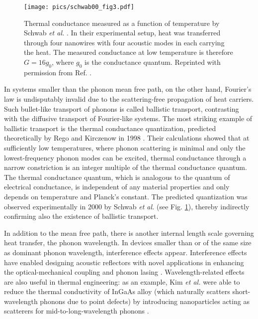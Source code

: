 \begin{figure}
\begin{center}
 \texttt{[image: pics/schwab00\_fig3.pdf]}
 \caption{Thermal conductance measured as a function of temperature by Schwab \textit{et al.} \cite{schwab00}. In their experimental setup, heat was transferred through four nanowires with four acoustic modes in each carrying the heat. The measured conductance at low temperature is therefore $G=16g_0$, where $g_0$ is the conductance quantum. Reprinted with permission from Ref. \cite{schwab00}.}
\label{fig:intro_schwab}
\end{center}
\end{figure}

In systems smaller than the phonon mean free path, on the other hand, Fourier's law is undisputably invalid due to the scattering-free propagation of heat carriers. Such bullet-like transport of phonons is called ballistic transport, contrasting with the diffusive transport of Fourier-like systems. The most striking example of ballistic transport is the thermal conductance quantization, predicted theoretically by Rego and Kirczenow in 1998 \cite{rego98}. Their calculations showed that at sufficiently low temperatures, where phonon scattering is minimal and only the lowest-frequency phonon modes can be excited, thermal conductance through a narrow constriction is an integer multiple of the thermal conductance quantum. The thermal conductance quantum, which is analogous to the quantum of electrical conductance, is independent of any material properties and only depends on temperature and Planck's constant. The predicted quantization was observed experimentally in 2000 by Schwab \textit{et al.} \cite{schwab00} (see Fig. \ref{fig:intro_schwab}), thereby indirectly confirming also the existence of ballistic transport.

In addition to the mean free path, there is another internal length scale governing heat transfer, the phonon wavelength. In devices smaller than or of the same size as dominant phonon wavelength, interference effects appear. Interference effects have enabled designing acoustic reflectors with novel applications in enhancing the optical-mechanical coupling \cite{fainstein13} and phonon lasing \cite{maryam13}. Wavelength-related effects are also useful in thermal engineering: as an example, Kim \textit{et al.} were able to reduce the thermal conductivity of InGaAs alloy (which naturally scatters short-wavelength phonons due to point defects) by introducing nanoparticles acting as scatterers for mid-to-long-wavelength phonons \cite{kim06}. %

